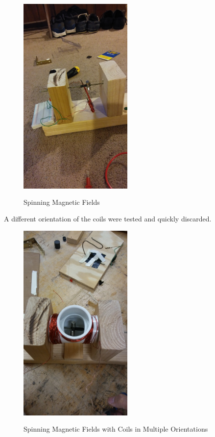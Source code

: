     \begin{figure}[ht]
        \begin{center}
            \includegraphics[width=0.5\textwidth]{figures/models/3.jpg}
            \label{fig:model3}
        \end{center} \caption{Spinning Magnetic Fields}
    \end{figure}

    \noindent
    A different orientation of the coils were tested and quickly discarded.

    \begin{figure}[ht]
        \begin{center}
            \includegraphics[width=0.5\textwidth]{figures/models/4.jpg}
            \label{fig:model4}
        \end{center} \caption{Spinning Magnetic Fields with Coils in Multiple Orientations}
    \end{figure}

